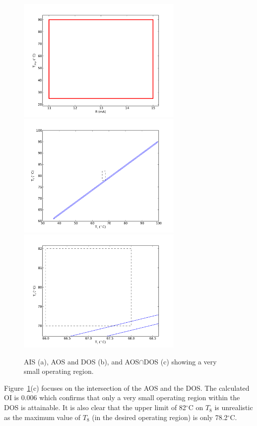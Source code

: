 \documentclass[final,authoryear,5pt,times,twocolumn]{elsarticle}
\newcommand{\degrees}[1]{^{\circ}\text{{#1}}} %
\begin{document}
\begin{figure}[htbp]
  \centering
    \includegraphics[width=8cm]{columnais.pdf}
    \includegraphics[width=8cm]{columnaos.pdf}
    \includegraphics[width=8cm]{columnaosfocus.pdf}
  \caption{AIS (a), AOS and DOS (b), and AOS$\cap$DOS (c) showing a very small operating region.}
  \label{fig:columnaisaos}
\end{figure}

Figure~\ref{fig:columnaisaos}(c) focuses on the intersection of the AOS and the DOS.
The calculated OI is 0.006 which confirms that only a very small operating region within the DOS is attainable.
It is also clear that the upper limit of 82$\degrees{C}$ on $T_8$ is unrealistic as the maximum value of $T_8$ (in the desired operating region) is only 78.2$\degrees{C}$.
\end{document}
